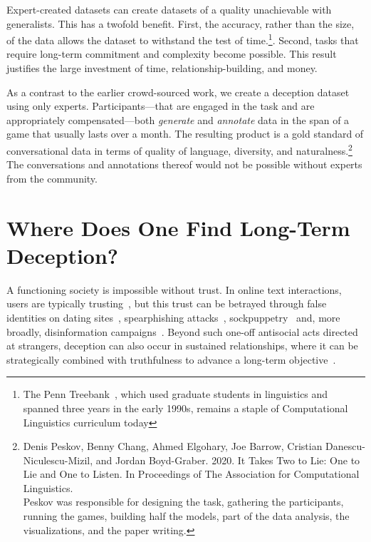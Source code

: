 Expert-created datasets can create datasets of a quality unachievable with generalists.  
%
This has a twofold benefit.
%
First, the accuracy, rather than the size, of the data allows the dataset to withstand the test of time.\footnote{The Penn Treebank~\citep{marcus1993building2}, which used graduate students in linguistics and spanned three years in the early 1990s, remains a staple of Computational Linguistics curriculum today}.
%
Second, tasks that require long-term commitment and complexity become possible.  
%
This result justifies the large investment of time, relationship-building, and money.  

As a contrast to the earlier crowd-sourced work, we create a deception dataset using only experts.
%
Participants---that are engaged in the task and  are appropriately compensated---both \textit{generate} and \textit{annotate} data in the span of a game that usually lasts over a month. 
%  
The resulting product is a gold standard of conversational \nlp{} data in terms of quality of language, diversity, and naturalness.\footnote{Denis Peskov, Benny Chang, Ahmed Elgohary, Joe Barrow, Cristian Danescu-Niculescu-Mizil, and Jordan Boyd-Graber. 2020. It Takes Two to Lie: One to Lie and One to Listen. In Proceedings of The Association for Computational Linguistics.\\
Peskov was responsible for designing the task, gathering the participants, running the games, building half the models, part of the data analysis, the visualizations, and the paper writing.}  
%
The conversations and annotations thereof would not be possible without experts from the community.

\section{Where Does One Find Long-Term Deception?}
\label{sec:intro}


A functioning society is impossible without trust.
%
In online text interactions, users are typically
trusting~\citep{shneiderman2000designing}, but this trust can be
betrayed through false identities on dating sites~\citep{toma2012lies},
spearphishing attacks~\citep{Dhamija2006WhyPW},
sockpuppetry~\citep{kumar_army_2017} and, more broadly, disinformation
campaigns~\citep{kumar_false_2018}.
%
Beyond such one-off antisocial acts directed at strangers, deception
can also occur in sustained relationships, where it can be
strategically combined with truthfulness to advance a long-term
objective~\citep{ Cornwell2001LoveOT, kaplar2004enigma}.

